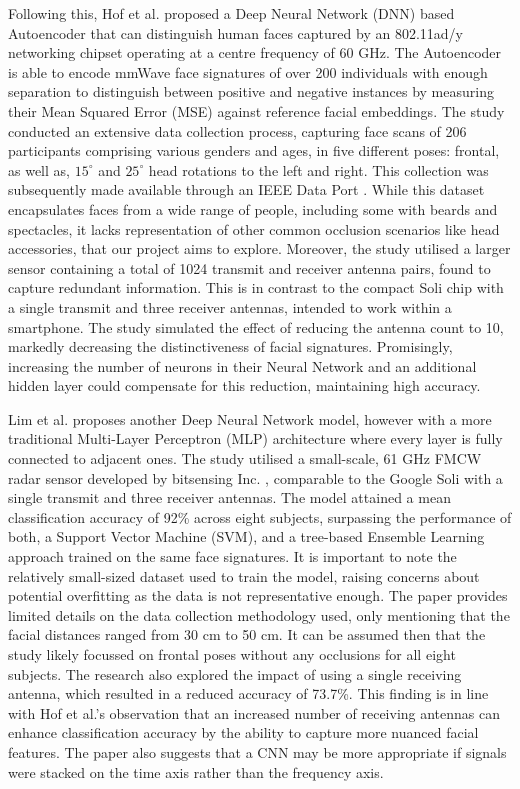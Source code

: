 \documentclass{mpaper}
\begin{document}
Following this, Hof et al. \cite{hof2020face} proposed a Deep Neural Network (DNN) based Autoencoder that can distinguish human faces captured by an 802.11ad/y networking chipset operating at a centre frequency of 60 GHz. The Autoencoder is able to encode mmWave face signatures of over 200 individuals with enough separation to distinguish between positive and negative instances by measuring their Mean Squared Error (MSE) against reference facial embeddings. The study conducted an extensive data collection process, capturing face scans of 206 participants comprising various genders and ages, in five different poses: frontal, as well as, $15^\circ$ and $25^\circ$ head rotations to the left and right. This collection was subsequently made available through an IEEE Data Port \cite{mmwavefacedata}. While this dataset encapsulates faces from a wide range of people, including some with beards and spectacles, it lacks representation of other common occlusion scenarios like head accessories, that our project aims to explore. Moreover, the study utilised a larger sensor containing a total of 1024 transmit and receiver antenna pairs, found to capture redundant information. This is in contrast to the compact Soli chip with a single transmit and three receiver antennas, intended to work within a smartphone. The study simulated the effect of reducing the antenna count to 10, markedly decreasing the distinctiveness of facial signatures. Promisingly, increasing the number of neurons in their Neural Network and an additional hidden layer could compensate for this reduction, maintaining high accuracy.

Lim et al. \cite{lim2020dnn} proposes another Deep Neural Network model, however with a more traditional Multi-Layer Perceptron (MLP) architecture where every layer is fully connected to adjacent ones. The study utilised a small-scale, 61 GHz FMCW radar sensor developed by bitsensing Inc. \cite{bitsensing2020bts60}, comparable to the Google Soli with a single transmit and three receiver antennas. The model attained a mean classification accuracy of 92\% across eight subjects, surpassing the performance of both, a Support Vector Machine (SVM), and a tree-based Ensemble Learning approach trained on the same face signatures. It is important to note the relatively small-sized dataset used to train the model, raising concerns about potential overfitting as the data is not representative enough. The paper provides limited details on the data collection methodology used, only mentioning that the facial distances ranged from 30 cm to 50 cm. It can be assumed then that the study likely focussed on frontal poses without any occlusions for all eight subjects. The research also explored the impact of using a single receiving antenna, which resulted in a reduced accuracy of 73.7\%. This finding is in line with Hof et al.'s \cite{hof2020face} observation that an increased number of receiving antennas can enhance classification accuracy by the ability to capture more nuanced facial features. The paper also suggests that a CNN may be more appropriate if signals were stacked on the time axis rather than the frequency axis.
\end{document}

